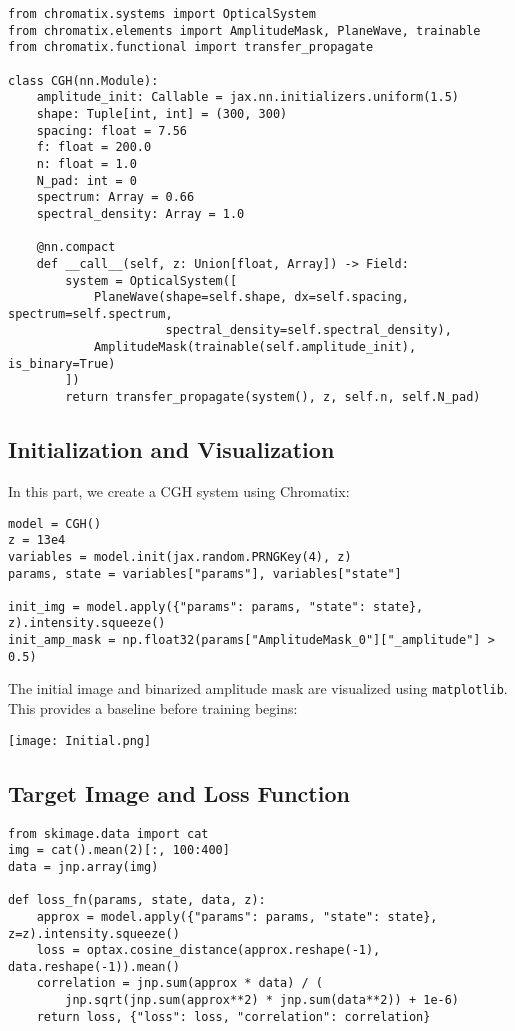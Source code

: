 \documentclass[a4paper,12pt]{report}
\begin{document}
\begin{verbatim}
from chromatix.systems import OpticalSystem
from chromatix.elements import AmplitudeMask, PlaneWave, trainable
from chromatix.functional import transfer_propagate

class CGH(nn.Module):
    amplitude_init: Callable = jax.nn.initializers.uniform(1.5)
    shape: Tuple[int, int] = (300, 300)
    spacing: float = 7.56
    f: float = 200.0
    n: float = 1.0
    N_pad: int = 0
    spectrum: Array = 0.66
    spectral_density: Array = 1.0

    @nn.compact
    def __call__(self, z: Union[float, Array]) -> Field:
        system = OpticalSystem([
            PlaneWave(shape=self.shape, dx=self.spacing, spectrum=self.spectrum,
                      spectral_density=self.spectral_density),
            AmplitudeMask(trainable(self.amplitude_init), is_binary=True)
        ])
        return transfer_propagate(system(), z, self.n, self.N_pad)
\end{verbatim}

\subsection{Initialization and Visualization}

In this part, we create a CGH system using Chromatix:

\begin{verbatim}
model = CGH()
z = 13e4
variables = model.init(jax.random.PRNGKey(4), z)
params, state = variables["params"], variables["state"]

init_img = model.apply({"params": params, "state": state}, z).intensity.squeeze()
init_amp_mask = np.float32(params["AmplitudeMask_0"]["_amplitude"] > 0.5)
\end{verbatim}

The initial image and binarized amplitude mask are visualized using \texttt{matplotlib}. This provides a baseline before training begins:

\begin{center}
  \texttt{[image: Initial.png]}
\end{center}

\subsection{Target Image and Loss Function}

\begin{verbatim}
from skimage.data import cat
img = cat().mean(2)[:, 100:400]
data = jnp.array(img)

def loss_fn(params, state, data, z):
    approx = model.apply({"params": params, "state": state}, z=z).intensity.squeeze()
    loss = optax.cosine_distance(approx.reshape(-1), data.reshape(-1)).mean()
    correlation = jnp.sum(approx * data) / (
        jnp.sqrt(jnp.sum(approx**2) * jnp.sum(data**2)) + 1e-6)
    return loss, {"loss": loss, "correlation": correlation}
\end{verbatim}
\end{document}
